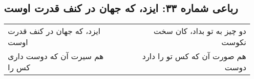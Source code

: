 \begin{center}
\section*{رباعی شماره ۳۳: ایزد، که جهان در کنف قدرت اوست}
\label{sec:033}
\begin{longtable}{l p{0.5cm} r}
ایزد، که جهان در کنف قدرت اوست
&&
دو چیز به تو بداد، کان سخت نکوست
\\
هم سیرت آن که دوست داری کس را
&&
هم صورت آن که کس تو را دارد دوست
\\
\end{longtable}
\end{center}
